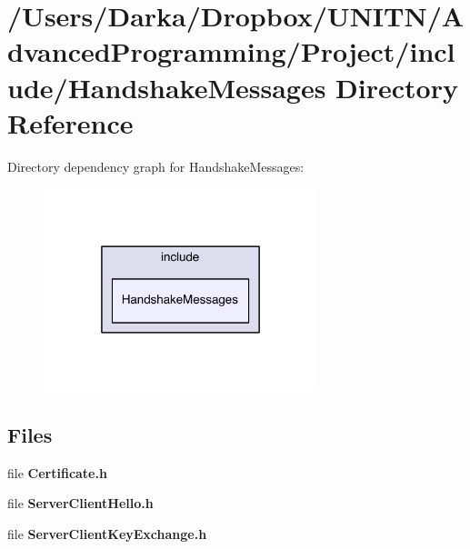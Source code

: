\section{/\+Users/\+Darka/\+Dropbox/\+U\+N\+I\+T\+N/\+Advanced\+Programming/\+Project/include/\+Handshake\+Messages Directory Reference}
\label{dir_f44360a83f75d3985446a6a966f5fa1a}
Directory dependency graph for Handshake\+Messages\+:\nopagebreak
\begin{figure}[H]
\begin{center}
\leavevmode
\includegraphics[width=226pt]{dir_f44360a83f75d3985446a6a966f5fa1a_dep}
\end{center}
\end{figure}
\subsection*{Files}
\begin{DoxyCompactItemize}
\item 
file {\bf Certificate.\+h}
\item 
file {\bf Server\+Client\+Hello.\+h}
\item 
file {\bf Server\+Client\+Key\+Exchange.\+h}
\end{DoxyCompactItemize}
